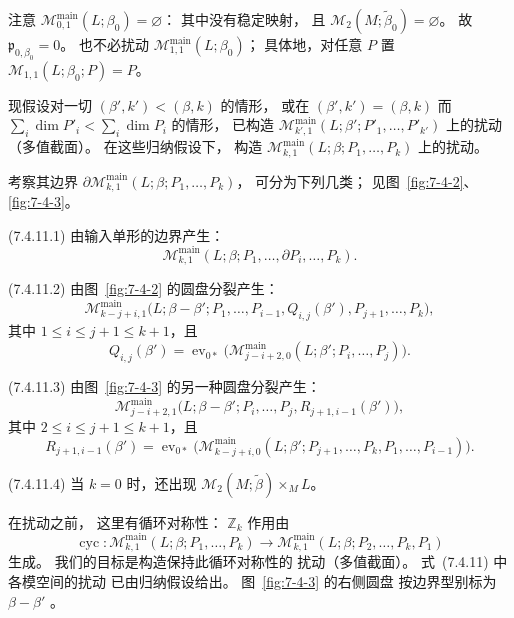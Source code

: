 注意
$\mathcal M^{\mathrm{main}}_{0,1}(L;\beta_0)
=\varnothing$：
其中没有稳定映射，
且
$\mathcal M_2(M;\widetilde\beta_0)
=\varnothing$。
故 $\mathfrak p_{0,\beta_0}=0$。
也不必扰动
$\mathcal M^{\mathrm{main}}_{1,1}(L;\beta_0)$；
具体地，对任意 $P$ 置
$\mathcal M_{1,1}(L;\beta_0;P)=P$。

现假设对一切
$(\beta',k')<(\beta,k)$
的情形，
或在 $(\beta',k')=(\beta,k)$
而
$\sum_i\dim P'_i<\sum_i\dim P_i$
的情形，
已构造
$\mathcal M^{\mathrm{main}}_{k',1}
(L;\beta';P'_1,\ldots,P'_{k'})$
上的扰动（多值截面）。
在这些归纳假设下，
构造
$\mathcal M^{\mathrm{main}}_{k,1}
(L;\beta;P_1,\ldots,P_k)$
上的扰动。

考察其边界
$\partial\mathcal M^{\mathrm{main}}_{k,1}
(L;\beta;P_1,\ldots,P_k)$，
可分为下列几类；
见图~\ref{fig:7-4-2}、
\ref{fig:7-4-3}。

\par\noindent\textup{(7.4.11.1)}\label{cond:7-4-11-1}\quad
由输入单形的边界产生：
\[
\mathcal M^{\mathrm{main}}_{k,1}
(L;\beta;P_1,\ldots,\partial P_i,\ldots,P_k).
\]

\par\noindent\textup{(7.4.11.2)}\label{cond:7-4-11-2}\quad
由图~\ref{fig:7-4-2} 的圆盘分裂产生：
\[
\mathcal M^{\mathrm{main}}_{k-j+i,1}
\bigl(L;\beta-\beta';
P_1,\ldots,P_{i-1},
Q_{i,j}(\beta'),P_{j+1},\ldots,P_k\bigr),
\]
其中 $1\leq i\leq j+1\leq k+1$，且
\[
Q_{i,j}(\beta')
=\operatorname{ev}_{0*}
\bigl(\mathcal M^{\mathrm{main}}_{j-i+2,0}
(L;\beta';P_i,\ldots,P_j)\bigr).
\]

\par\noindent\textup{(7.4.11.3)}\label{cond:7-4-11-3}\quad
由图~\ref{fig:7-4-3} 的另一种圆盘分裂产生：
\[
\mathcal M^{\mathrm{main}}_{j-i+2,1}
\bigl(L;\beta-\beta';
P_i,\ldots,P_j,R_{j+1,i-1}(\beta')\bigr),
\]
其中 $2\leq i\leq j+1\leq k+1$，且
\[
R_{j+1,i-1}(\beta')
=\operatorname{ev}_{0*}
\bigl(\mathcal M^{\mathrm{main}}_{k-j+i,0}
(L;\beta';P_{j+1},\ldots,P_k,
P_1,\ldots,P_{i-1})\bigr).
\]

\par\noindent\textup{(7.4.11.4)}\label{cond:7-4-11-4}\quad
当 $k=0$ 时，还出现
$\mathcal M_2(M;\widetilde\beta)\times_M L$。

在扰动之前，
这里有循环对称性：
$\mathbb Z_k$ 作用由
\[
\operatorname{cyc}\colon
\mathcal M^{\mathrm{main}}_{k,1}
(L;\beta;P_1,\ldots,P_k)
\longrightarrow
\mathcal M^{\mathrm{main}}_{k,1}
(L;\beta;P_2,\ldots,P_k,P_1)
\]
生成。
我们的目标是构造保持此循环对称性的
扰动（多值截面）。
式~(7.4.11) 中各模空间的扰动
已由归纳假设给出。
图~\ref{fig:7-4-3} 的右侧圆盘
按边界型别标为 $\beta-\beta'$
。


